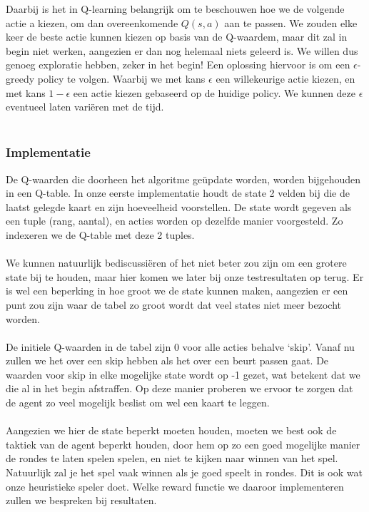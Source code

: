 \documentclass[11pt]{article}
\begin{document}
Daarbij is het in Q-learning belangrijk om te beschouwen hoe we de volgende actie a kiezen, om dan overeenkomende $Q(s,a)$ aan te passen. We zouden elke keer de beste actie kunnen kiezen op basis van de Q-waardem, maar dit zal in begin niet werken, aangezien er dan nog helemaal niets geleerd is. We willen dus genoeg exploratie hebben, zeker in het begin! Een oplossing hiervoor is om een $\epsilon$-greedy policy te volgen. Waarbij we met kans $\epsilon$ een willekeurige actie kiezen, en met kans $1-\epsilon$ een actie kiezen gebaseerd op de huidige policy. We kunnen deze $\epsilon$ eventueel laten variëren met de tijd.\\\\

\subsubsection{Implementatie}
De Q-waarden die doorheen het algoritme geüpdate worden, worden bijgehouden in een Q-table. In onze eerste implementatie houdt de state 2 velden bij die de laatst gelegde kaart en zijn hoeveelheid voorstellen. De state wordt gegeven als een tuple (rang, aantal), en acties worden op dezelfde manier voorgesteld. Zo indexeren we de Q-table met deze 2 tuples. \\\\
We kunnen natuurlijk bediscussiëren of het niet beter zou zijn om een grotere state bij te houden, maar hier komen we later bij onze testresultaten op terug. Er is wel een beperking in hoe groot we de state kunnen maken, aangezien er een punt zou zijn waar de tabel zo groot wordt dat veel states niet meer bezocht worden. \\\\
De initiele Q-waarden in de tabel zijn 0 voor alle acties behalve `skip'. Vanaf nu zullen we het over een skip hebben als het over een beurt passen gaat. De waarden voor skip in elke mogelijke state wordt op -1 gezet, wat betekent dat we die al in het begin afstraffen. Op deze manier proberen we ervoor te zorgen dat de agent zo veel mogelijk beslist om wel een kaart te leggen. \\\\
Aangezien we hier de state beperkt moeten houden, moeten we best ook de taktiek van de agent beperkt houden, door hem op zo een goed mogelijke manier de rondes te laten spelen spelen, en niet te kijken naar winnen van het spel. Natuurlijk zal je het spel vaak winnen als je goed speelt in rondes. Dit is ook wat onze heuristieke speler doet. Welke reward functie we daaroor implementeren zullen we bespreken bij resultaten.\\\\
\end{document}
